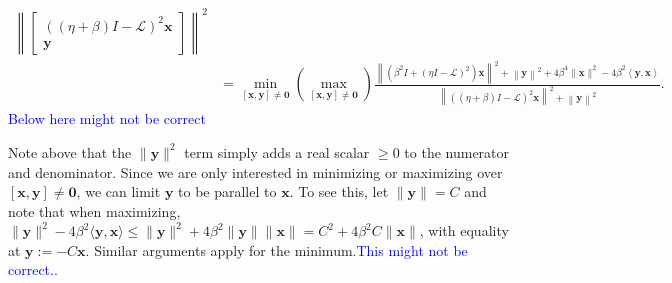 \documentclass[a4paper,10pt]{article}
\newcommand{\tcb}{\textcolor{blue}}
\begin{document}
\begin{align*}
		{\left\|\begin{bmatrix} ((\eta +\beta)I - \mathcal{L})^{2}\mathbf{x}\\
			\mathbf{y}\end{bmatrix}\right\|^2} \\
& = \min_{[\mathbf{x},\mathbf{y}]\neq\mathbf{0}}
		(\max_{[\mathbf{x},\mathbf{y}]\neq\mathbf{0}})
	\frac{\left\|(\beta^2I + (\eta I - \mathcal{L})^{2})\mathbf{x}\right\|^2 +
			\left\|\mathbf{y}\right\|^2
			+ 4\beta^4\|\mathbf{x}\|^2 - 4\beta^2\left\langle 
				\mathbf{y}, \mathbf{x}\right\rangle}
		{\left\|((\eta +\beta)I - \mathcal{L})^{2}\mathbf{x}\right\|^2 +
			\left\|\mathbf{y}\right\|^2}.
\end{align*}
%
\tcb{Below here might not be correct}

Note above that the $\|\mathbf{y}\|^2$ term simply adds a real scalar $\geq 0$
to the numerator and denominator. Since we are only interested in minimizing or
maximizing over $[\mathbf{x},\mathbf{y}]\neq\mathbf{0}$, we can limit $\mathbf{y}$
to be parallel to $\mathbf{x}$. To see this, let $\|\mathbf{y}\| = C$ and note
that when maximizing, $\|\mathbf{y}\|^2 -4\beta^2 \langle \mathbf{y},\mathbf{x} \rangle
\leq \|\mathbf{y}\|^2 + 4\beta^2\|\mathbf{y}\|\|\mathbf{x}\|
= C^2 + 4\beta^2C\|\mathbf{x}\|$, with equality at $\mathbf{y} := -C\mathbf{x}$.
Similar arguments apply for the minimum.\tcb{This might not be correct..}
\end{document}

